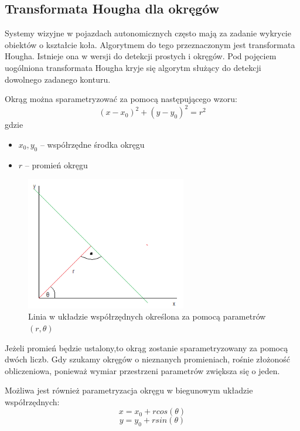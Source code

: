 \subsection{Transformata Hougha dla okręgów}

Systemy wizyjne w pojazdach autonomicznych często mają za zadanie wykrycie obiektów o kształcie koła. Algorytmem do tego przeznaczonym jest transformata Hougha. Istnieje ona w wersji do detekcji prostych i okręgów. Pod pojęciem uogólniona transformata Hougha kryje się algorytm służący do detekcji dowolnego zadanego konturu.

Okrąg można sparametryzować za pomocą następującego wzoru:
\begin{equation}
(x-x_0)^2+(y-y_0)^2=r^2
\end{equation}
gdzie
\begin{itemize}
\item $x_0, y_0$ -- współrzędne środka okręgu
\item $r$ -- promień okręgu
\end{itemize}

\begin{figure}[h]
\centering
\includegraphics[width=7cm]{img/hough.png}
\caption{Linia w układzie współrzędnych określona za pomocą parametrów $(r, \theta)$}
\label{fig:hough}
\end{figure}

Jeżeli promień będzie ustalony,to okrąg zostanie sparametryzowany za pomocą dwóch liczb. Gdy szukamy okręgów o nieznanych promieniach, rośnie złożoność obliczeniowa, ponieważ wymiar przestrzeni parametrów zwiększa się o jeden.

Możliwa jest również parametryzacja okręgu w biegunowym układzie współrzędnych:
\begin{equation}
x = x_0 + rcos(\theta)
\end{equation}
\begin{equation}
y = y_0 + rsin(\theta)
\end{equation}

